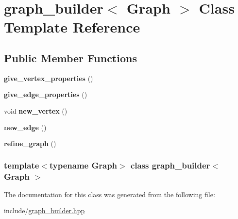 \hypertarget{classgraph__builder}{
\section{graph\_\-builder$<$ Graph $>$ Class Template Reference}
\label{classgraph__builder}
}
\subsection*{Public Member Functions}
\begin{DoxyCompactItemize}
\item 
\hypertarget{classgraph__builder_a1c6f1ed27dc1b99ae5b11782820b5be8}{
{\bfseries give\_\-vertex\_\-properties} ()}
\label{classgraph__builder_a1c6f1ed27dc1b99ae5b11782820b5be8}

\item 
\hypertarget{classgraph__builder_a75163d186ce5a088d623a7a3fae295b2}{
{\bfseries give\_\-edge\_\-properties} ()}
\label{classgraph__builder_a75163d186ce5a088d623a7a3fae295b2}

\item 
\hypertarget{classgraph__builder_ad66e50e9a81742ebfcc6d6993e02c562}{
void {\bfseries new\_\-vertex} ()}
\label{classgraph__builder_ad66e50e9a81742ebfcc6d6993e02c562}

\item 
\hypertarget{classgraph__builder_a6e6fa9be70d5a14a5d501186d84d36df}{
{\bfseries new\_\-edge} ()}
\label{classgraph__builder_a6e6fa9be70d5a14a5d501186d84d36df}

\item 
\hypertarget{classgraph__builder_a75bbecf7ecfa7011c9e7a31515dab109}{
{\bfseries refine\_\-graph} ()}
\label{classgraph__builder_a75bbecf7ecfa7011c9e7a31515dab109}

\end{DoxyCompactItemize}
\subsubsection*{template$<$typename Graph$>$ class graph\_\-builder$<$ Graph $>$}



The documentation for this class was generated from the following file:\begin{DoxyCompactItemize}
\item 
include/\hyperlink{graph__builder_8hpp}{graph\_\-builder.hpp}\end{DoxyCompactItemize}
